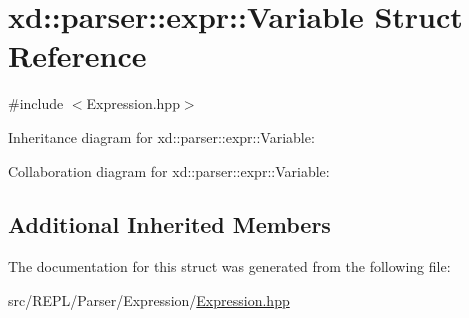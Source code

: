 \hypertarget{structxd_1_1parser_1_1expr_1_1_variable}{}\section{xd\+:\+:parser\+:\+:expr\+:\+:Variable Struct Reference}
\label{structxd_1_1parser_1_1expr_1_1_variable}


{\ttfamily \#include $<$Expression.\+hpp$>$}



Inheritance diagram for xd\+:\+:parser\+:\+:expr\+:\+:Variable\+:


Collaboration diagram for xd\+:\+:parser\+:\+:expr\+:\+:Variable\+:
\subsection*{Additional Inherited Members}


The documentation for this struct was generated from the following file\+:\begin{DoxyCompactItemize}
\item 
src/\+R\+E\+P\+L/\+Parser/\+Expression/\mbox{\hyperlink{_expression_8hpp}{Expression.\+hpp}}\end{DoxyCompactItemize}
